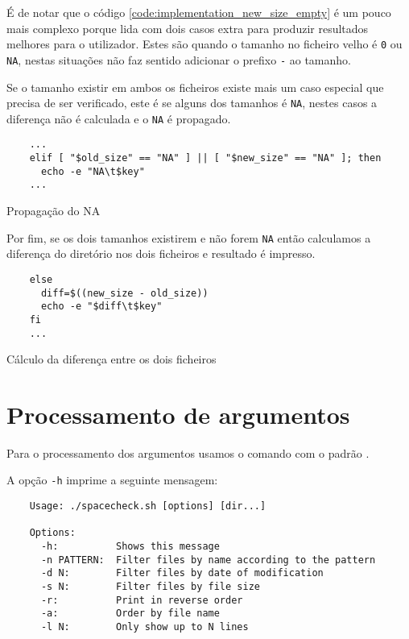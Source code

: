 É de notar que o código \ref{code:implementation_new_size_empty} é um pouco mais
complexo porque lida com dois casos extra para produzir resultados melhores para
o utilizador. Estes são quando o tamanho no ficheiro velho é \Verb|0| ou
\Verb|NA|, nestas situações não faz sentido adicionar o prefixo \Verb|-| ao
tamanho.

Se o tamanho existir em ambos os ficheiros existe mais um caso especial que
precisa de ser verificado, este é se alguns dos tamanhos é \Verb|NA|, nestes
casos a diferença não é calculada e o \Verb|NA| é propagado.

\begin{listing}[H]
	\centering
	\begin{verbatim}
    ...
    elif [ "$old_size" == "NA" ] || [ "$new_size" == "NA" ]; then
      echo -e "NA\t$key"
    ...
  \end{verbatim}
	\caption{Propagação do NA}
\end{listing}

Por fim, se os dois tamanhos existirem e não forem \Verb|NA| então calculamos a
diferença do diretório nos dois ficheiros e resultado é impresso.

\begin{listing}[H]
	\centering
	\begin{verbatim}
    else
      diff=$((new_size - old_size))
      echo -e "$diff\t$key"
    fi
    ...
  \end{verbatim}
	\caption{Cálculo da diferença entre os dois ficheiros}
\end{listing}

\section{Processamento de argumentos}\label{sec:implementation_arg_parsing}

Para o processamento dos argumentos usamos o comando  com o padrão .

A opção \Verb|-h| imprime a seguinte mensagem:

\begin{listing}[H]
	\centering
	\begin{verbatim}
    Usage: ./spacecheck.sh [options] [dir...]

    Options:
      -h:          Shows this message
      -n PATTERN:  Filter files by name according to the pattern
      -d N:        Filter files by date of modification
      -s N:        Filter files by file size
      -r:          Print in reverse order
      -a:          Order by file name
      -l N:        Only show up to N lines
  \end{verbatim}
\end{listing}

